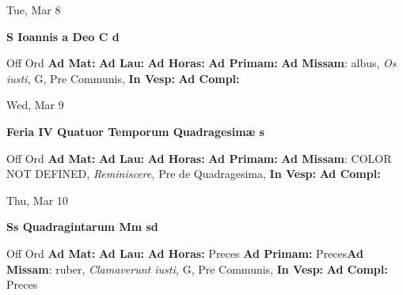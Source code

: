 \documentclass[10pt]{memoir}
\begin{document}
\begin{center}
\begin{minipage}{3.5in}
\vspace{2em}
\begin{center}Tue, Mar 8
\end{center}
\textbf{ \large S Ioannis a Deo C
\textnormal{\normalsize d}}

\begin{justify}Off Ord
\textbf{Ad Mat: }
\textbf{Ad Lau: }
\textbf{Ad Horas: }
\textbf{Ad Primam: }\textbf{Ad Missam}: albus, \textit{Os iusti,} G, Pre Communis, 
\textbf{In Vesp: }
\textbf{Ad Compl: }
\end{justify}
\end{minipage}
\end{center}

\begin{center}
\begin{minipage}{3.5in}
\vspace{2em}
\begin{center}Wed, Mar 9
\end{center}
\textbf{ \large Feria IV Quatuor Temporum Quadragesimæ
\textnormal{\normalsize s}}

\begin{justify}Off Ord
\textbf{Ad Mat: }
\textbf{Ad Lau: }
\textbf{Ad Horas: }
\textbf{Ad Primam: }\textbf{Ad Missam}: COLOR NOT DEFINED, \textit{Reminiscere,} Pre de Quadragesima, 
\textbf{In Vesp: }
\textbf{Ad Compl: }
\end{justify}
\end{minipage}
\end{center}

\begin{center}
\begin{minipage}{3.5in}
\vspace{2em}
\begin{center}Thu, Mar 10
\end{center}
\textbf{ \large Ss Quadragintarum Mm
\textnormal{\normalsize sd}}

\begin{justify}Off Ord
\textbf{Ad Mat: }
\textbf{Ad Lau: }
\textbf{Ad Horas: }Preces
\textbf{Ad Primam: }Preces\textbf{Ad Missam}: ruber, \textit{Clamaverunt iusti,} G, Pre Communis, 
\textbf{In Vesp: }
\textbf{Ad Compl: }Preces
\end{justify}
\end{minipage}
\end{center}
\end{document}
